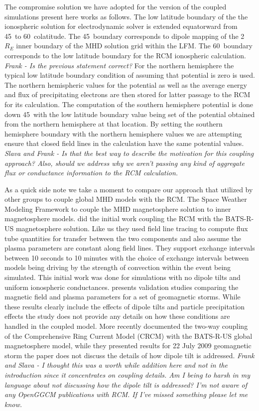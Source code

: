 \documentclass[draft,jgrga]{agutex}
\begin{document}
\begin{article}
The compromise solution we have adopted for the version of the coupled simulations present here works as follows.  The low latitude boundary of the the ionospheric solution for electrodynamic solver is extended equatorward from 45\degree ~to 60\degree ~colatitude.   The 45\degree ~boundary corresponds to dipole mapping of the 2 $R_E$ inner boundary of the MHD solution grid within the LFM.  The 60\degree ~boundary corresponds to the low latitude boundary for the RCM ionospheric calculation. {\em Frank - Is the previous statement correct?} For the northern hemisphere the typical low latitude boundary condition of assuming that potential is zero is used.  The northern hemispheric values for the potential as well as the average energy and flux of precipitating electrons are then stored for latter passage to the RCM for its calculation.  The computation of the southern hemisphere potential is done down 45\degree ~with the low latitude boundary value being set of the potential obtained from the northern hemisphere at that location.   By setting the southern hemisphere boundary with the northern hemisphere values we are attempting ensure that closed field lines in the calculation have the same potential values.   {\em Slava and Frank - Is that the best way to describe the motivation for this coupling approach?  Also, should we address why we aren't passing any kind of aggregate flux or conductance information to the RCM calculation.}

As a quick side note we take a moment to compare our approach that utilized by other groups to couple global MHD models with the RCM.  The Space Weather Modeling Framework \cite{2005JGRA..11012226T} to couple the MHD magnetosphere solution to inner magnetosphere models.   \cite{2004JGRA..10912219D} did the initial work coupling the RCM with the BATS-R-US magnetosphere solution.  Like us they used field line tracing to compute flux tube quantities for transfer between the two components and also assume the plasma parameters are constant along field lines.  They support exchange intervals between 10 seconds to 10 minutes with the choice of exchange intervals between models being driving by the strength of  convection within the event being simulated.  This initial work was done for simulations with no dipole tilts and uniform ionospheric conductances.   \cite{2010SpWea...803002W} presents validation studies comparing the magnetic field and plasma parameters for a set of geomagnetic storms.  While these results clearly include the effects of dipole tilts and particle precipitation effects the study does not provide any details on how these conditions are handled in the coupled model.   More recently \cite{Glocer:2013dv} documented the two-way coupling of the Comprehensive Ring Current Model (CRCM) with the BATS-R-US global magnetosphere model, while they presented results for 22 July 2009 geomagnetic storm the paper does not discuss the details of how dipole tilt is addressed.  {\em Frank and Slava - I thought this was a worth while addition here and not in the introduction since it concentrates on coupling details.  Am I being to harsh in my language about not discussing how the dipole tilt is addressed? I'm not aware of any OpenGGCM publications with RCM.  If I've missed something please let me know.}


\end{article}
\end{document}
